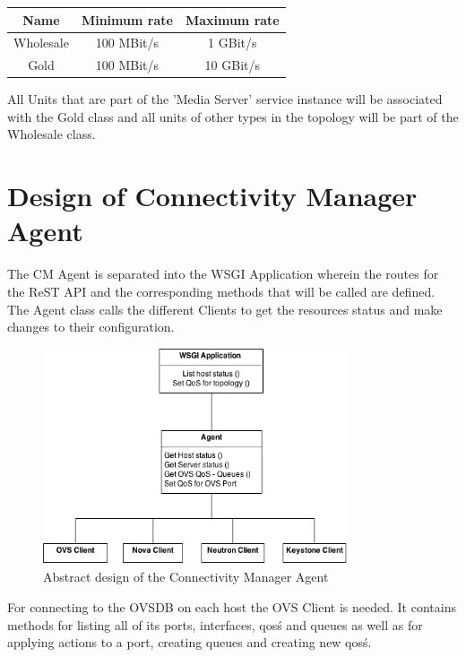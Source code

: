 \begin{center}
\begin{tabular}{|c|c|c|}
\hline \textbf{Name} & Minimum rate & Maximum rate \\ 
\hline Wholesale & 100 MBit/s & 1 GBit/s \\ 
\hline Gold & 100 MBit/s & 10 GBit/s \\ 
\hline 
\end{tabular} 
\end{center}

All Units that are part of the 'Media Server' service instance will be associated with the Gold class and all units of other types in the topology will be part of the Wholesale class.


\newpage
\section{Design of Connectivity Manager Agent}

The CM Agent is separated into the WSGI Application wherein the routes for the ReST API and the corresponding methods that will be called are defined. The Agent class calls the different Clients to get the resources status and make changes to their configuration.

\begin{figure}[H]
\centering

\includegraphics[width=0.8\textwidth]{images/design/cm_agent_design_class_diagram.png}

\caption{Abstract design of the Connectivity Manager Agent}
\end{figure}

For connecting to the OVSDB on each host the OVS Client is needed. It contains methods for listing all of its ports, interfaces, qos\'s and queues as well as for applying actions to a port, creating queues and creating new qos\'s.


